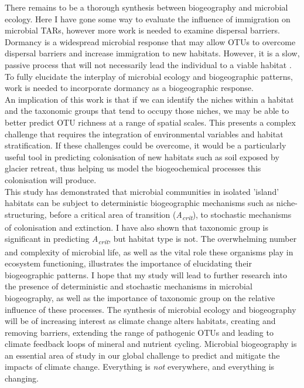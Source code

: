 
\noindent There remains to be a thorough synthesis between biogeography and microbial ecology. Here I have gone some way to evaluate the influence of immigration on microbial TARs, however more work is needed to examine dispersal barriers. Dormancy is a widespread microbial response that may allow OTUs to overcome dispersal barriers and increase immigration to new habitats. However, it is a slow, passive process that will not necessarily lead the individual to a viable habitat \cite{LoceyKennethJ2010Stbw}. To fully elucidate the interplay of microbial ecology and biogeographic patterns, work is needed to incorporate dormancy as a biogeographic response.  \\         

\noindent An implication of this work is that if we can identify the niches within a habitat and the taxonomic groups that tend to occupy those niches, we may be able to better predict OTU richness at a range of spatial scales. This presents a complex challenge that requires the integration of environmental variables and habitat stratification. If these challenges could be overcome, it would be a particularly useful tool in predicting colonisation of new habitats such as soil exposed by glacier retreat, thus helping us model the biogeochemical processes this colonisation will produce. \\      

\noindent This study has demonstrated that microbial communities in isolated 'island' habitats can be subject to deterministic biogeographic mechanisms such as niche-structuring, before a critical area of transition (\textit{A\textsubscript{crit}}), to stochastic mechanisms of colonisation and extinction. I have also shown that taxonomic group is significant in predicting \textit{A\textsubscript{crit}}, but habitat type is not. The overwhelming number and complexity of microbial life, as well as the vital role these organisms play in ecosystem functioning, illustrates the importance of elucidating their biogeographic patterns. I hope that my study will lead to further research into the presence of deterministic and stochastic mechanisms in microbial biogeography, as well as the importance of taxonomic group on the relative influence of these processes. The synthesis of microbial ecology and biogeography will be of increasing interest as climate change alters habitats, creating and removing barriers, extending the range of pathogenic OTUs and leading to climate feedback loops of mineral and nutrient cycling. Microbial biogeography is an essential area of study in our global challenge to predict and mitigate the impacts of climate change. Everything is \textit{not} everywhere, and everything is changing.             